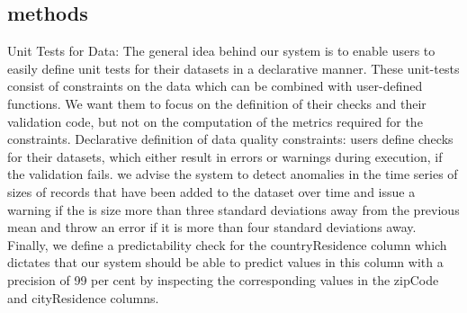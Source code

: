 \documentclass{article}
\begin{document}
\subsection{methods}
Unit Tests for Data: The general idea behind our system is to enable users to easily define unit tests for their datasets in a declarative manner. These unit-tests consist of constraints on
the data which can be combined with user-defined functions. We want them to focus on the definition of their checks and their validation code, but not on the computation of the metrics required for the constraints.
Declarative definition of data quality constraints: users define checks for their datasets, which either result in errors or warnings during execution, if the validation fails.
we advise the system to detect anomalies in the time series of sizes of records that have been added to the dataset over time and issue a warning if the is size more than three standard deviations away from the previous mean and throw an error if it is more than four standard deviations away. Finally, we define a predictability check for the countryResidence column which dictates that our system should be able to predict values in this column with a precision of 99 per cent by inspecting the corresponding values in the zipCode and cityResidence columns.
\end{document}
